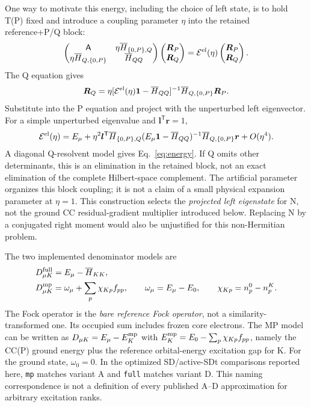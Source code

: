 \documentclass[11pt,letterpaper]{article}
\numberwithin{equation}{section}
\newcommand{\bH}{\overline H}
\newcommand{\T}{\mathsf T}
\begin{document}
One way to motivate this energy, including the choice of left state, is to
hold T(P) fixed and introduce a coupling parameter $\eta$ into the retained reference+P/Q block:
\begin{equation}
 \begin{pmatrix}\mathsf A&\eta\bH_{\{0,P\},Q}\\
 \eta\bH_{Q,\{0,P\}}&\bH_{QQ}\end{pmatrix}
 \begin{pmatrix}\bm R_P\\\bm R_Q\end{pmatrix}
 =\mathcal E^{\rm el}(\eta)\begin{pmatrix}\bm R_P\\\bm R_Q\end{pmatrix}.
\end{equation}
The Q equation gives
\begin{equation}
 \bm R_Q=\eta[\mathcal E^{\rm el}(\eta)\mathbf1-\bH_{QQ}]^{-1}
                         \bH_{Q,\{0,P\}}\bm R_P.
\end{equation}
Substitute into the P equation and project with the unperturbed left
eigenvector. For a simple unperturbed eigenvalue and $\bm l^\T\bm r=1$,
\begin{equation}
 \mathcal E^{\rm el}(\eta)=E_\mu+\eta^2
 \bm l^\T\bH_{\{0,P\},Q}(E_\mu\mathbf1-\bH_{QQ})^{-1}
 \bH_{Q,\{0,P\}}\bm r+O(\eta^4).
 \label{eq:resolventorigin}
\end{equation}
A diagonal Q-resolvent model gives Eq.~\eqref{eq:energy}. If Q omits other
determinants, this is an elimination in the retained block, not an exact
elimination of the complete Hilbert-space complement. The artificial
parameter organizes this block coupling; it is not a claim of a small
physical expansion parameter at $\eta=1$. This construction selects the
\emph{projected left eigenstate} for N, not the ground CC residual-gradient
multiplier introduced below. Replacing N by a conjugated right moment
would also be unjustified for this non-Hermitian problem.

The two implemented denominator models are
\begin{align}
 D_{\mu K}^{\rm full}&=E_\mu-\bH_{KK}, \label{eq:denfull}\\
 D_{\mu K}^{\rm mp}&=\omega_\mu+\sum_p\chi_{Kp}f_{pp},\qquad
 \omega_\mu=E_\mu-E_0,\qquad
 \chi_{Kp}=n_p^0-n_p^K. \label{eq:denmp}
\end{align}
The Fock operator is the \emph{bare reference Fock operator}, not a
similarity-transformed one. Its occupied sum includes frozen core electrons.
The MP model can be written as $D_{\mu K}=E_\mu-E_K^{\rm mp}$ with
$E_K^{\rm mp}=E_0-\sum_p\chi_{Kp}f_{pp}$, namely the CC(P) ground energy
plus the reference orbital-energy excitation gap for K.
For the ground state, $\omega_0=0$. In the optimized SD/active-SDt comparisons
reported here, \texttt{mp} matches variant A and \texttt{full} matches variant D.
This naming correspondence is not a definition of every published A--D
approximation for arbitrary excitation ranks.
\end{document}
